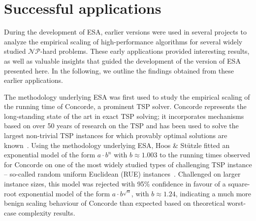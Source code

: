 \documentclass[aic]{iosart2x}
\begin{document}
\section{Successful applications}
\label{sec:Successful Applications}

During the development of ESA, earlier versions were used in several projects to analyze the empirical scaling of high-performance algorithms for several widely studied $\mathcal{NP}$-hard problems. 
These early applications provided interesting results, as well as valuable insights that guided the development of the version of ESA presented here.
In the following, we outline the findings obtained from these earlier applications.

The methodology underlying ESA was first used to study the empirical scaling of the running time of Concorde, a prominent TSP solver.
Concorde represents the long-standing state of the art in exact TSP solving; it incorporates mechanisms based on over 50 years of research on the TSP and has been used to solve the largest non-trivial TSP instances for which provably optimal solutions are known~\cite{AppEtAl06,AppEtAl12}.
Using the methodology underlying ESA, Hoos \& St\"utzle fitted an exponential model of the form $a\cdot b^n$ with $b \approx 1.003$ to the running times observed for Concorde on one of the most widely studied types of challenging TSP instance -- so-called random uniform Euclidean (RUE) instances~\cite{HooStu14}.
Challenged on larger instance sizes, this model was rejected with 95\% confidence in favour of a square-root exponential model of the form $a\cdot b^{\sqrt{n}}$, with $b \approx 1.24$, indicating a much more benign scaling behaviour of Concorde than expected based on theoretical worst-case complexity results.
\end{document}
